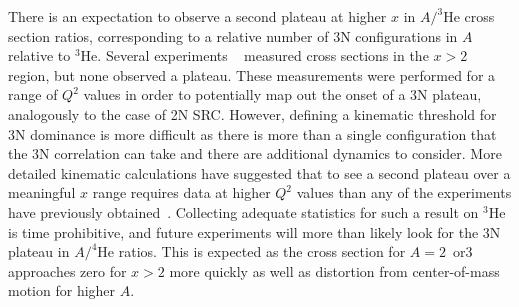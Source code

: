 There is an expectation to observe a second plateau at higher $x$ in $A/^3\mathrm{He}$ cross section ratios, corresponding to a relative number of 3N configurations in $A$ relative to $^3$He.  Several experiments ~\cite{PhysRevLett.96.082501, Fomin:2011ng, PhysRevC.97.065204} measured cross sections in the $x>2$ region, but none observed a plateau.  These measurements were performed for a range of $Q^2$ values in order to potentially map out the onset of a 3N plateau, analogously to the case of 2N SRC.  However, defining a kinematic threshold for 3N dominance is more difficult as there is more than a single configuration that the 3N correlation can take and there are additional dynamics to consider.  More detailed kinematic calculations have suggested that to see a second plateau over a meaningful $x$ range requires data at higher $Q^2$ values than any of the experiments have previously obtained~\cite{Fomin:2017ydn}.  Collecting adequate statistics for such a result on $^3$He is time prohibitive, and future experiments will more than likely look for the 3N plateau in $A/^4\mathrm{He}$ ratios.  This is expected as the cross section for $A=2$~or$3$ approaches zero for $x>2$ more quickly as well as distortion from center-of-mass motion for higher $A$. 




